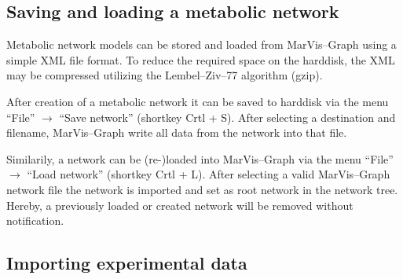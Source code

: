 \documentclass[titlepage,a4paper,twoside]{article}
\newcommand{\mg}{MarVis--Graph\xspace}
\begin{document}
\subsection{Saving and loading a metabolic network}\label{ssec:saveload}

Metabolic network models can be stored and loaded from \mg using a simple XML
file format. To reduce the required space on the harddisk, the XML may be
compressed utilizing the Lembel--Ziv--77 algorithm (gzip).

After creation of a metabolic network it can be saved to harddisk
via the menu ``File'' $\rightarrow$ ``Save network'' (shortkey Crtl + S). 
After selecting a destination and filename, \mg write all data from the
network into that file. 

Similarily, a network can be (re-)loaded into \mg via the menu ``File''
$\rightarrow$ ``Load network'' (shortkey Crtl + L). After selecting a valid
\mg network file the network is imported and set as root network in the
network tree. Hereby, a previously loaded or created network will be removed
without notification.

\subsection{Importing experimental data}
\end{document}
